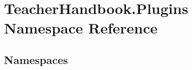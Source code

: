 \hypertarget{namespace_teacher_handbook_1_1_plugins}{}\section{Teacher\+Handbook.\+Plugins Namespace Reference}
\label{namespace_teacher_handbook_1_1_plugins}
\subsection*{Namespaces}
\begin{DoxyCompactItemize}
\end{DoxyCompactItemize}
